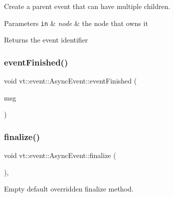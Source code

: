 Create a parent event that can have multiple children. 


\begin{DoxyParams}[1]{Parameters}
\mbox{\tt in}  & {\em node} & the node that owns it\\
\hline
\end{DoxyParams}
\begin{DoxyReturn}{Returns}
the event identifier 
\end{DoxyReturn}
\mbox{\label{structvt_1_1event_1_1_async_event_a2228d79f1c1f838e630dcb3325edfde3}} 
\subsubsection{\texorpdfstring{event\+Finished()}{eventFinished()}}
{\footnotesize\ttfamily void vt\+::event\+::\+Async\+Event\+::event\+Finished (\begin{DoxyParamCaption}\item[{\hyperlink{structvt_1_1_event_finished_msg}{Event\+Finished\+Msg} $\ast$}]{msg }\end{DoxyParamCaption})\hspace{0.3cm}{\ttfamily [static]}}

\mbox{\label{structvt_1_1event_1_1_async_event_a77e3aafaae98603825556cdf8105ba57}} 
\subsubsection{\texorpdfstring{finalize()}{finalize()}}
{\footnotesize\ttfamily void vt\+::event\+::\+Async\+Event\+::finalize (\begin{DoxyParamCaption}{ }\end{DoxyParamCaption})\hspace{0.3cm}{\ttfamily [override]}, {\ttfamily [virtual]}}



Empty default overridden finalize method. 



